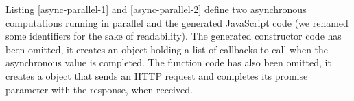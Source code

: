 \documentclass[american,english,runningheads]{llncs}
\begin{document}
Listing \ref{async-parallel-1} and \ref{async-parallel-2} define two asynchronous computations running in parallel and the generated JavaScript code (we renamed some identifiers for the sake of readability). The generated  constructor code has been omitted, it creates an object holding a list of callbacks to call when the asynchronous value is completed. The  function code has also been omitted, it creates a  object that sends an HTTP request and completes its promise parameter with the response, when received.

% 
% 
% 
% 
% 
% 
\end{document}
